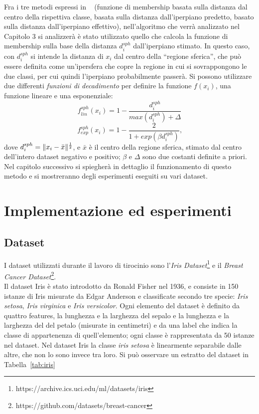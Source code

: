 \documentclass[oneside, openany]{book}
\DeclarePairedDelimiter{\norma}{\lVert}{\rVert}
\begin{document}
	Fra i tre metodi espressi in ~\cite{bib:cil} (funzione di membership basata sulla distanza dal centro della rispettiva classe, basata sulla distanza dall'iperpiano predetto, basato sulla distanza dall'iperpiano effettivo), nell'algoritmo che verrà analizzato nel Capitolo 3 si analizzerà è stato utilizzato quello che calcola la funzione di membership sulla base della distanza $d_i^{sph}$ dall'iperpiano stimato. In questo caso, con $d_i^{sph}$ si intende la distanza di $x_i$ dal centro della ``regione sferica'', che può essere definita come un'ipersfera che copre la regione in cui si sovrappongono le due classi, per cui quindi l'iperpiano probabilmente passerà. Si possono utilizzare due differenti \textit{funzioni di decadimento} per definire la funzione $f(x_i)$, una funzione lineare e una esponenziale:
	\[
		f_{lin}	^{sph}(x_i) = 1 - \frac{d_i^{sph}}{max(d_i^{sph})+\Delta} 
	\]
	\[
		f_{exp}	^{sph}(x_i) = 1 - \frac{2}{1+exp(\beta d_i^{sph})}\text{,}
	\]
	dove $d_i^{sph}=\norma{x_i-\bar{x}}^{\frac{1}{2}}$, e $\bar{x}$ è il centro della regione sferica, stimato dal centro dell'intero dataset negativo e positivo; $\beta$ e $\Delta$ sono due costanti definite a priori. Nel capitolo successivo si spiegherà in dettaglio il funzionamento di questo metodo e si mostreranno degli esperimenti eseguiti su vari dataset.	

	\chapter{Implementazione ed esperimenti}
	\label{chap:3}
	\section{Dataset}
	I dataset utilizzati durante il lavoro di tirocinio sono l'\textit{Iris Dataset}\footnote{https://archive.ics.uci.edu/ml/datasets/iris} e il \textit{Breast Cancer Dataset}\footnote{https://github.com/datasets/breast-cancer}.\\
	Il dataset Iris è stato introdotto da Ronald Fisher nel 1936, e consiste in 150 istanze di Iris misurate da Edgar Anderson e classificate secondo tre specie: \textit{Iris setosa}, \textit{Iris virginica} e \textit{Iris versicolor}. Ogni elemento del dataset è definito da quattro features, la lunghezza e la larghezza del sepalo e la lunghezza e la larghezza del del petalo (misurate in centimetri) e da una label che indica la classe di appartenenza di quell'elemento; ogni classe è rappresentata da 50 istanze nel dataset. Nel dataset Iris la classe \textit{iris setosa} è linearmente separabile dalle altre, che non lo sono invece tra loro. Si può osservare un estratto del dataset in Tabella~\ref{tab:iris}
	
\end{document}
